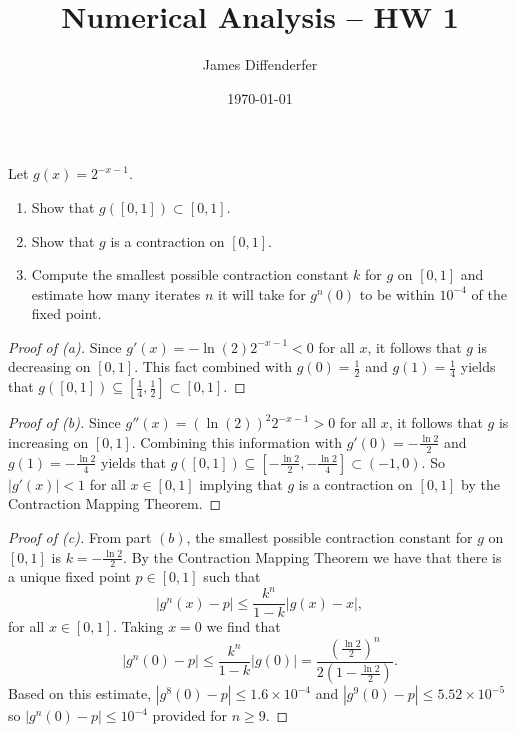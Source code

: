 \documentclass[8pt]{article}
\title{Numerical Analysis -- HW 1}
\author{James Diffenderfer}
\date{\today}
\theoremstyle{definition}
\newenvironment{exercise}[1]
  {\renewcommand\theinnerexercise{#1}\innerexercise}
  {\endinnerexercise}
\begin{document}
\maketitle


\begin{exercise}{1}
Let $g(x) = 2^{-x - 1}$.
\begin{enumerate}
	\item[(a)] Show that $g \left( [0, 1] \right) \subset [0, 1]$.
	\item[(b)] Show that $g$ is a contraction on $[0, 1]$.
	\item[(c)] Compute the smallest possible contraction constant $k$ for $g$ on $[0, 1]$ and estimate how many iterates $n$ it will take for $g^{n} (0)$ to be within $10^{-4}$ of the fixed point.
\end{enumerate}
\end{exercise}
\begin{proof}[Proof of (a)]
Since $g' (x) = - \ln (2) 2^{-x - 1} < 0$ for all $x$, it follows that $g$ is decreasing on $[0, 1]$. This fact combined with $g(0) = \frac{1}{2}$ and $g(1) = \frac{1}{4}$ yields that $g \left( [0, 1] \right) \subseteq [\frac{1}{4}, \frac{1}{2}] \subset [0, 1]$.
\end{proof}

\begin{proof}[Proof of (b)]
	Since $g'' (x) = \left(\ln (2)\right)^2 2^{-x - 1} > 0$ for all $x$, it follows that $g$ is increasing on $[0, 1]$. Combining this information with $g'(0) = -\frac{\ln 2}{2}$ and $g(1) = - \frac{\ln 2}{4}$ yields that $g \left( [0, 1] \right) \subseteq [- \frac{\ln 2}{2}, - \frac{\ln 2}{4}] \subset (-1, 0)$. So $| g'(x) | < 1$ for all $x \in [0, 1]$ implying that $g$ is a contraction on $[0, 1]$ by the Contraction Mapping Theorem.
\end{proof}

\begin{proof}[Proof of (c)]
	From part $(b)$, the smallest possible contraction constant for $g$ on $[0, 1]$ is $k = - \frac{\ln 2}{2}$. By the Contraction Mapping Theorem we have that there is a unique fixed point $p \in [0, 1]$ such that $$| g^n (x) - p | \leq \frac{k^n}{1 - k} | g(x) - x |,$$ for all $x \in [0, 1]$. Taking $x = 0$ we find that $$| g^n (0) - p | \leq \frac{k^n}{1 - k} | g(0) | = \frac{\left( \frac{\ln 2}{2}\right)^n}{2 \left(1 - \frac{\ln 2}{2} \right)}.$$ Based on this estimate, $| g^8 (0) - p | \leq 1.6 \times 10^{-4}$ and $| g^9 (0) - p | \leq 5.52 \times 10^{-5}$ so $| g^n (0) - p | \leq  10^{-4}$ provided for $n \geq 9$.
\end{proof}
\end{document}
